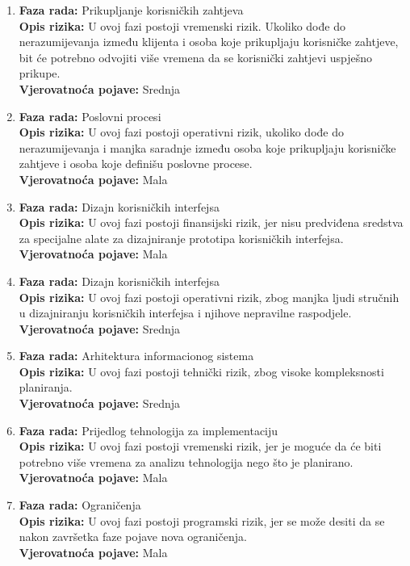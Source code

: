 \begin{enumerate}
    \item \textbf{Faza rada:} Prikupljanje korisničkih zahtjeva \\
    \textbf{Opis rizika:} U ovoj fazi postoji vremenski rizik. Ukoliko dođe do nerazumijevanja između klijenta i osoba koje prikupljaju korisničke zahtjeve, bit će potrebno odvojiti više vremena da se korisnički zahtjevi uspješno prikupe. \\
    \textbf{Vjerovatnoća pojave:} Srednja

    \item \textbf{Faza rada:} Poslovni procesi \\
    \textbf{Opis rizika:} U ovoj fazi postoji operativni rizik, ukoliko dođe do nerazumijevanja i manjka saradnje između osoba koje prikupljaju korisničke zahtjeve i osoba koje definišu poslovne procese. \\
    \textbf{Vjerovatnoća pojave:} Mala

    \item \textbf{Faza rada:} Dizajn korisničkih interfejsa \\
    \textbf{Opis rizika:} U ovoj fazi postoji finansijski rizik, jer nisu predviđena sredstva za specijalne alate za dizajniranje prototipa korisničkih interfejsa. \\
    \textbf{Vjerovatnoća pojave:} Mala

    \item \textbf{Faza rada:} Dizajn korisničkih interfejsa \\
    \textbf{Opis rizika:} U ovoj fazi postoji operativni rizik, zbog manjka ljudi stručnih u dizajniranju korisničkih interfejsa i njihove nepravilne raspodjele. \\
    \textbf{Vjerovatnoća pojave:} Srednja

    \item \textbf{Faza rada:} Arhitektura informacionog sistema \\
    \textbf{Opis rizika:} U ovoj fazi postoji tehnički rizik, zbog visoke kompleksnosti planiranja. \\
    \textbf{Vjerovatnoća pojave:} Srednja

    \item \textbf{Faza rada:} Prijedlog tehnologija za implementaciju \\
    \textbf{Opis rizika:} U ovoj fazi postoji vremenski rizik, jer je moguće da će biti potrebno više vremena za analizu tehnologija nego što je planirano. \\
    \textbf{Vjerovatnoća pojave:} Mala
    
    \item \textbf{Faza rada:} Ograničenja \\
    \textbf{Opis rizika:} U ovoj fazi postoji programski rizik, jer se može desiti da se nakon završetka faze pojave nova ograničenja. \\
    \textbf{Vjerovatnoća pojave:} Mala
\end{enumerate}

